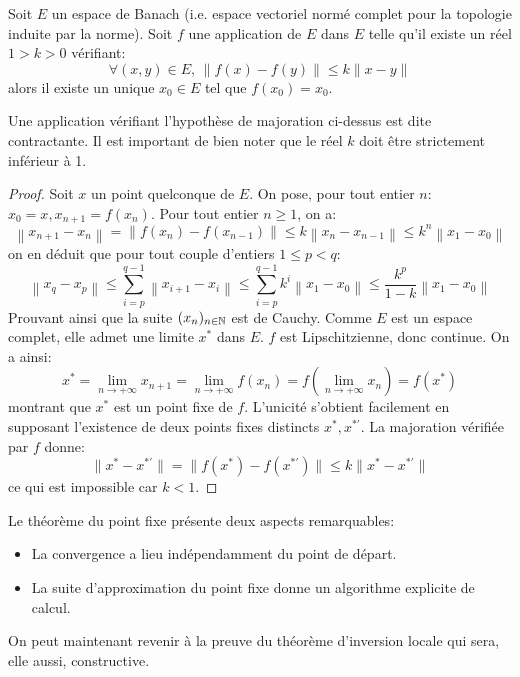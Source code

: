 \begin{fthm} \label{thm:pt_fixe}
Soit $E$ un espace de Banach (i.e. espace vectoriel normé complet pour la topologie induite par la norme). Soit $f$ une application de $E$ dans $E$ telle qu'il existe un réel $1 > k > 0$ vérifiant:
\[
\forall (x,y) \in E, \, \|f(x)-f(y)\| \leq k \|x-y\|
\]
alors il existe un unique $x_0 \in E$ tel que $f(x_0)=x_0$.
\end{fthm}
Une application vérifiant l'hypothèse de majoration ci-dessus est dite contractante. Il est important de bien noter que le réel $k$ doit être strictement inférieur à 1. 
\begin{proof}
Soit $x$ un point quelconque de $E$. On pose, pour tout entier $n$: $x_0 = x, x_{n+1}=f(x_n)$. Pour tout entier $n \geq 1$, on a:
\[
\left\| x_{n+1}-x_n \right \| = \left\| f(x_n)-f(x_{n-1}) \right \| \leq k \left\| x_n-x_{n-1} \right \|
\leq k^n \left\| x_1-x_0 \right \| 
\]
on en déduit que pour tout couple d'entiers $1 \leq p < q$:
\[
\left\| x_q - x_p \right \| \leq \sum_{i=p}^{q-1} \left\| x_{i+1} - x_i \right \| \leq \sum_{i=p}^{q-1} k^i \left\| x_1-x_0 \right \| \leq \frac{k^p}{1-k} \left\| x_1-x_0 \right \|
\]
Prouvant ainsi que la suite $(x_n)_{n \in {\mathbb N}}$ est de Cauchy. Comme $E$ est un espace complet, elle admet une limite $x^*$ dans $E$. $f$ est Lipschitzienne, donc continue. On a ainsi:
\[
x^* = \lim_{n \to +\infty } x_{n+1} = \lim_{n \to +\infty} f(x_n) = f\left( \lim_{n \to +\infty} x_n \right)
=f(x^*)
\]
montrant que $x^*$ est un point fixe de $f$. L'unicité s'obtient facilement en supposant l'existence de deux points fixes distincts $x^*, x^{*\prime}$. La majoration vérifiée par $f$ donne:
\[
\|x^* - x^{*\prime}\|= \|f(x^*) - f(x^{*\prime})\| \leq k \|x^* - x^{*\prime}\|
\] 
ce qui est impossible car $k < 1$.
\end{proof}
\begin{rem}
Le théorème du point fixe présente deux aspects remarquables: 
\begin{itemize}
\item La convergence a lieu indépendamment du point de départ. 
\item La suite d'approximation du point fixe donne un algorithme explicite de calcul.
\end{itemize}
\end{rem}
On peut maintenant revenir à la preuve du théorème d'inversion locale qui sera, elle aussi, constructive.
